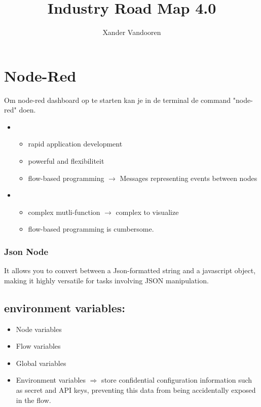 \documentclass[12pt]{article}
\begin{document}
\begin{titlepage}
    \author{Xander Vandooren}
    \title{Industry Road Map 4.0}
\end{titlepage}
\maketitle
\newpage
\tableofcontents
\newpage
{}
\section{Node-Red}
Om node-red dashboard op te starten kan je in de terminal de command "node-red" doen.
\begin{itemize}
    \item[]\begin{itemize}\textbf{voordelen:}
    \item rapid application development
    \item powerful and flexibiliteit
    \item flow-based programming $\rightarrow$ Messages representing events between nodes
    \end{itemize}
    \item[]\begin{itemize}\textbf{nadelen:}
        \item complex mutli-function $\rightarrow$ complex to visualize
        \item flow-based programming is cumbersome.
        \end{itemize}
\end{itemize}
\subsubsection{Json Node}
It allows you to convert between a Json-formatted string and a javascript object, making it highly versatile for tasks involving JSON manipulation.
\subsection{environment variables:}
\begin{itemize}
    \item Node variables
    \item Flow variables
    \item Global variables
    \item Environment variables $\Rightarrow$ store confidential configuration information such as secret and API keys, preventing this data from being accidentally exposed in the flow.
\end{itemize}
\end{document}
